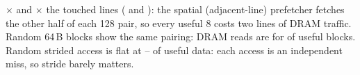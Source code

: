 $\times$ and $\times$ the touched
lines ( and
): the spatial (adjacent-line) prefetcher fetches the
other half of each \qty{128}{\byte} pair, so every useful \qty{8}{\byte} costs two lines of DRAM traffic.
Random 64\,B blocks show the same pairing: DRAM reads are 
for  of useful blocks. Random strided access is flat at
-- of useful data: each access is
an independent miss, so stride barely matters.
